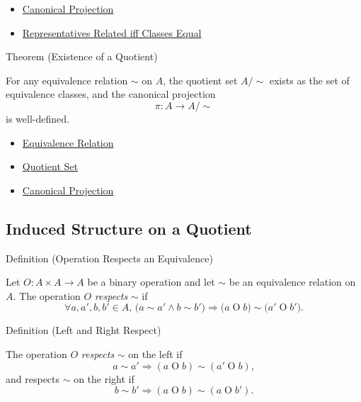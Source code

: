 \begin{dependencies}
\begin{itemize}
  \item \hyperref[def:canonical-projection]{Canonical Projection}
  \item \hyperref[prop:representatives-related-iff-classes-equal]{Representatives Related iff Classes Equal}
\end{itemize}
\end{dependencies}

\begin{theorembox}{Theorem (Existence of a Quotient)}
\begin{theorem}
\label{thm:existence-of-a-quotient}
For any equivalence relation $\sim$ on $A$, the quotient set $A/{\sim}$ exists
as the set of equivalence classes, and the canonical projection
\[
\pi:A\to A/{\sim}
\]
is well-defined.
\end{theorem}
\end{theorembox}

\begin{dependencies}
\begin{itemize}
  \item \hyperref[def:equivalence-relation]{Equivalence Relation}
  \item \hyperref[def:quotient-set]{Quotient Set}
  \item \hyperref[def:canonical-projection]{Canonical Projection}
\end{itemize}
\end{dependencies}

\subsection*{Induced Structure on a Quotient}

\begin{definitionbox}{Definition (Operation Respects an Equivalence)}
\begin{definition}
\label{def:operation-respects-equivalence}
Let $O:A\times A\to A$ be a binary operation and let $\sim$ be an equivalence
relation on $A$. The operation $O$ \emph{respects} $\sim$ if
\[
\forall a,a',b,b'\in A,\,
\bigl(a\sim a'\land b\sim b'\bigr)
\Longrightarrow
\bigl(a\mathbin{O}b\bigr)\sim\bigl(a'\mathbin{O}b'\bigr).
\]
\end{definition}
\end{definitionbox}

\begin{definitionbox}{Definition (Left and Right Respect)}
\begin{definition}
\label{def:left-right-respect-equivalence}
The operation $O$ \emph{respects} $\sim$ on the left if
\[
a\sim a'\Longrightarrow (a\mathbin{O}b)\sim(a'\mathbin{O}b),
\]
and respects $\sim$ on the right if
\[
b\sim b'\Longrightarrow (a\mathbin{O}b)\sim(a\mathbin{O}b').
\]
\end{definition}
\end{definitionbox}

